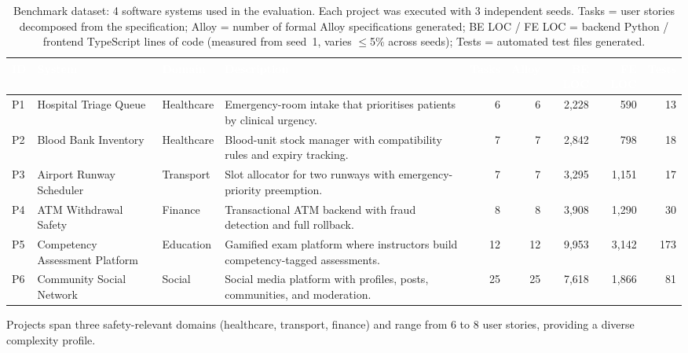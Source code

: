\begin{table}[t]
\centering
\caption{Benchmark dataset: 4 software systems used in the evaluation. Each project was executed with 3 independent seeds. Tasks = user stories decomposed from the specification; Alloy = number of formal Alloy specifications generated; BE LOC / FE LOC = backend Python / frontend TypeScript lines of code (measured from seed~1, varies $\leq$5\% across seeds); Tests = automated test files generated.}
\label{tab:dataset}
\renewcommand{\arraystretch}{1.15}
\begin{tabularx}{\linewidth}{@{} l l l X r r r r r @{}}
\toprule
\rowcolor[HTML]{2D3748}\textcolor{white}{\textbf{ID}} &\textcolor{white}{\textbf{System}} &\textcolor{white}{\textbf{Domain}} &\textcolor{white}{\textbf{Description}} &\textcolor{white}{\textbf{Tasks}} &\textcolor{white}{\textbf{Alloy}} &\textcolor{white}{\textbf{BE LOC}} &\textcolor{white}{\textbf{FE LOC}} &\textcolor{white}{\textbf{Tests}} \\
\midrule
  P1 & Hospital Triage Queue & Healthcare & \multicolumn{1}{p{4.5cm}}{\small Emergency-room intake that prioritises patients by clinical urgency.} & 6 & 6 & 2,228 & 590 & 13 \\
  P2 & Blood Bank Inventory & Healthcare & \multicolumn{1}{p{4.5cm}}{\small Blood-unit stock manager with compatibility rules and expiry tracking.} & 7 & 7 & 2,842 & 798 & 18 \\
  P3 & Airport Runway Scheduler & Transport & \multicolumn{1}{p{4.5cm}}{\small Slot allocator for two runways with emergency-priority preemption.} & 7 & 7 & 3,295 & 1,151 & 17 \\
  P4 & ATM Withdrawal Safety & Finance & \multicolumn{1}{p{4.5cm}}{\small Transactional ATM backend with fraud detection and full rollback.} & 8 & 8 & 3,908 & 1,290 & 30 \\
  P5 & Competency Assessment Platform & Education & \multicolumn{1}{p{4.5cm}}{\small Gamified exam platform where instructors build competency-tagged assessments.} & 12 & 12 & 9,953 & 3,142 & 173 \\
  P6 & Community Social Network & Social & \multicolumn{1}{p{4.5cm}}{\small Social media platform with profiles, posts, communities, and moderation.} & 25 & 25 & 7,618 & 1,866 & 81 \\
\bottomrule
\end{tabularx}
\footnotesize Projects span three safety-relevant domains (healthcare, transport, finance) and range from 6 to 8 user stories, providing a diverse complexity profile.
\end{table}
